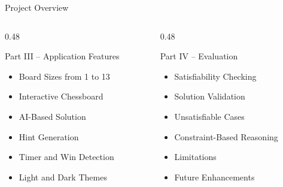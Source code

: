 \documentclass[aspectratio=169,12pt]{beamer}
\begin{document}
\begin{frame}{Project Overview}

\begin{columns}[T,totalwidth=\textwidth]

\begin{column}{0.48\textwidth}

\begin{block}{Part III -- Application Features}

\begin{itemize}
    \item Board Sizes from 1 to 13
    \item Interactive Chessboard
    \item AI-Based Solution
    \item Hint Generation
    \item Timer and Win Detection
    \item Light and Dark Themes
\end{itemize}

\end{block}

\end{column}

\begin{column}{0.48\textwidth}

\begin{block}{Part IV -- Evaluation}

\begin{itemize}
    \item Satisfiability Checking
    \item Solution Validation
    \item Unsatisfiable Cases
    \item Constraint-Based Reasoning
    \item Limitations
    \item Future Enhancements
\end{itemize}

\end{block}

\end{column}

\end{columns}

\end{frame}

\end{document}

